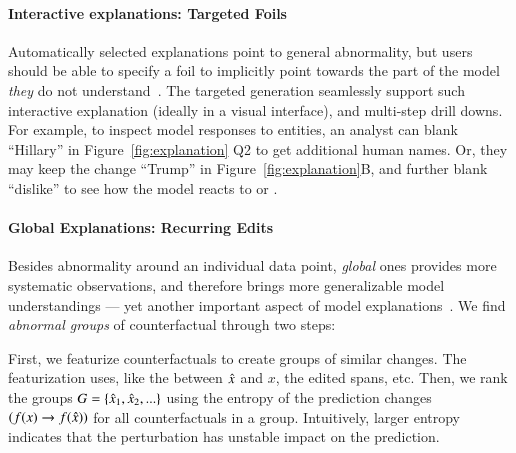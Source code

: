 \paragraph{Interactive explanations: Targeted Foils}
Automatically selected explanations point to general abnormality, but users should be able to specify a foil to implicitly point towards the part of the model \emph{they} do not understand~\cite{miller}.
The targeted generation seamlessly support such interactive explanation (ideally in a visual interface), and multi-step drill downs.
For example, to inspect model responses to entities, an analyst can blank ``Hillary'' in Figure~\ref{fig:explanation} Q2 to get additional human names.
Or, they may keep the change ``Trump'' in Figure~\ref{fig:explanation}B, and further blank ``dislike'' to see how the model reacts to  or  .


\paragraph{Global Explanations: Recurring Edits}
\label{subsec:global_exp}
Besides abnormality around an individual data point, \emph{global} ones provides more systematic observations, and therefore brings more generalizable model understandings --- yet another important aspect of model explanations~\cite{miller}.
We find \emph{abnormal groups} of counterfactual through two steps: 

First, we featurize counterfactuals to create groups of similar changes. 
The featurization uses, like the \tagstr between $\hat{x}$ and $x$, the edited spans, etc.
Then, we rank the groups $G = \{ \hat{x}_1, \hat{x}_2, ...\}$ using the entropy of the prediction changes $(f(x) \rightarrow f(\hat{x}))$ for all counterfactuals in a group.
Intuitively, larger entropy indicates that the perturbation has unstable impact on the prediction.

